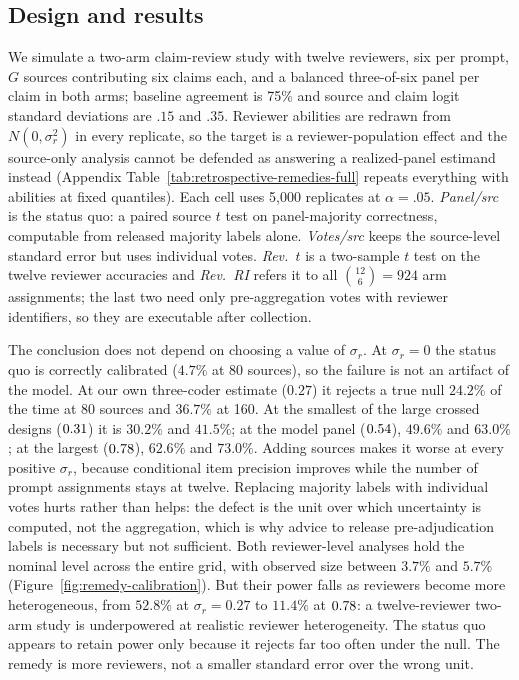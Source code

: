 \documentclass[11pt]{article}
\begin{document}
\subsection{Design and results}

We simulate a two-arm claim-review study with twelve reviewers, six per prompt,
$G$ sources contributing six claims each, and a balanced three-of-six panel per
claim in both arms; baseline agreement is 75\% and source and claim logit
standard deviations are $.15$ and $.35$. Reviewer abilities are redrawn from
$N(0,\sigma_r^2)$ in every replicate, so the target is a reviewer-population
effect and the source-only analysis cannot be defended as answering a
realized-panel estimand instead (Appendix
Table~\ref{tab:retrospective-remedies-full} repeats everything with abilities
at fixed quantiles). Each cell uses 5{,}000 replicates at $\alpha=.05$.
\emph{Panel/src} is the status quo: a paired source $t$ test on panel-majority
correctness, computable from released majority labels alone. \emph{Votes/src}
keeps the source-level standard error but uses individual votes. \emph{Rev.\
$t$} is a two-sample $t$ test on the twelve reviewer accuracies and \emph{Rev.\
RI} refers it to all $\binom{12}{6}=924$ arm assignments; the last two need
only pre-aggregation votes with reviewer identifiers, so they are executable
after collection.



The conclusion does not depend on choosing a value of $\sigma_r$. At
$\sigma_r=0$ the status quo is correctly calibrated ($4.7\%$ at 80 sources), so
the failure is not an artifact of the model. At our own three-coder estimate
($0.27$) it rejects a true null $24.2\%$ of the time at 80 sources and $36.7\%$
at 160. At the smallest of the large crossed designs ($0.31$) it is
$30.2\%$ and $41.5\%$; at the model panel ($0.54$), $49.6\%$ and
$63.0\%$; at the largest ($0.78$), $62.6\%$ and $73.0\%$.
Adding sources makes it worse at every positive $\sigma_r$, because conditional
item precision improves while the number of prompt assignments stays at twelve.
Replacing majority labels with individual votes hurts rather than helps: the
defect is the unit over which uncertainty is computed, not the aggregation,
which is why advice to release pre-adjudication labels is necessary but not
sufficient. Both reviewer-level analyses hold the nominal level across the
entire grid, with observed size between $3.7\%$ and $5.7\%$
(Figure~\ref{fig:remedy-calibration}). But their power falls as reviewers
become more heterogeneous, from $52.8\%$ at $\sigma_r=0.27$ to $11.4\%$ at
$0.78$: a twelve-reviewer two-arm study is underpowered at realistic
reviewer heterogeneity. The status quo appears to retain power only because it rejects
far too often under the null. The remedy is more reviewers, not a smaller
standard error over the wrong unit.
\end{document}
